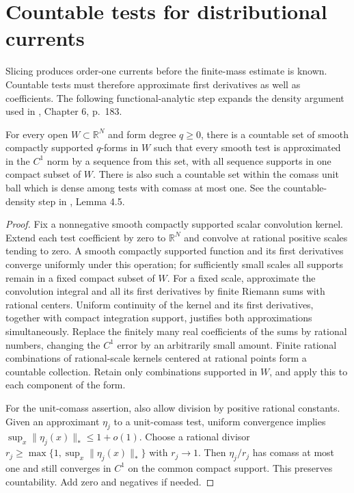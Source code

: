 \chapter{Countable tests for distributional currents}\label{sec:current-test-density}
Slicing produces order-one currents before the finite-mass estimate is known. Countable tests must therefore approximate first derivatives as well as coefficients. The following functional-analytic step expands the density argument used in \cite{Sim18}, Chapter 6, p.~183.

\begin{lemma}\label{lem:countable-current-c1-tests}
For every open $W\subset\mathbb R^N$ and form degree $q\geq0$, there is a countable set of smooth compactly supported $q$-forms in $W$ such that every smooth test is approximated in the $C^1$ norm by a sequence from this set, with all sequence supports in one compact subset of $W$. There is also such a countable set within the comass unit ball which is dense among tests with comass at most one. See the countable-density step in \cite{Sim18}, Lemma 4.5.
\end{lemma}
\begin{proof}
Fix a nonnegative smooth compactly supported scalar convolution kernel. Extend each test coefficient by zero to $\mathbb R^N$ and convolve at rational positive scales tending to zero. A smooth compactly supported function and its first derivatives converge uniformly under this operation; for sufficiently small scales all supports remain in a fixed compact subset of $W$. For a fixed scale, approximate the convolution integral and all its first derivatives by finite Riemann sums with rational centers. Uniform continuity of the kernel and its first derivatives, together with compact integration support, justifies both approximations simultaneously. Replace the finitely many real coefficients of the sums by rational numbers, changing the $C^1$ error by an arbitrarily small amount. Finite rational combinations of rational-scale kernels centered at rational points form a countable collection. Retain only combinations supported in $W$, and apply this to each component of the form.

For the unit-comass assertion, also allow division by positive rational constants. Given an approximant $\eta_j$ to a unit-comass test, uniform convergence implies $\sup_x\|\eta_j(x)\|_*\leq1+o(1)$. Choose a rational divisor $r_j\geq\max\{1,\sup_x\|\eta_j(x)\|_*\}$ with $r_j\to1$. Then $\eta_j/r_j$ has comass at most one and still converges in $C^1$ on the common compact support. This preserves countability. Add zero and negatives if needed.
\end{proof}

